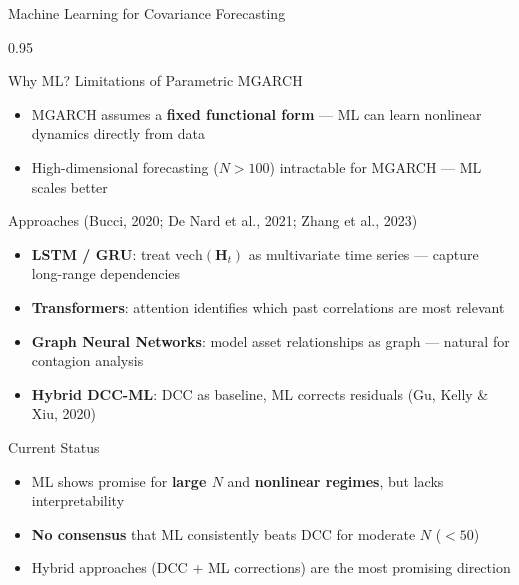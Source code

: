\documentclass[9pt, aspectratio=169, t]{beamer}
\begin{document}
\begin{frame}{Machine Learning for Covariance Forecasting}
    \begin{cminipage}{0.95\textwidth}
    \vspace{-3mm}
    {\scriptsize
    \begin{block}{Why ML? Limitations of Parametric MGARCH}
        \begin{itemize}\setlength{\itemsep}{0pt}
            \item MGARCH assumes a \textbf{fixed functional form} --- ML can learn nonlinear dynamics directly from data
            \item High-dimensional forecasting ($N > 100$) intractable for MGARCH --- ML scales better
        \end{itemize}
    \end{block}
    \vspace{-2mm}
    \begin{block}{Approaches (Bucci, 2020; De Nard et al., 2021; Zhang et al., 2023)}
        \begin{itemize}\setlength{\itemsep}{0pt}
            \item \textbf{LSTM / GRU}: treat $\text{vech}(\mathbf{H}_t)$ as multivariate time series --- capture long-range dependencies
            \item \textbf{Transformers}: attention identifies which past correlations are most relevant
            \item \textbf{Graph Neural Networks}: model asset relationships as graph --- natural for contagion analysis
            \item \textbf{Hybrid DCC-ML}: DCC as baseline, ML corrects residuals (Gu, Kelly \& Xiu, 2020)
        \end{itemize}
    \end{block}
    \vspace{-2mm}
    \begin{alertblock}{Current Status}
        \begin{itemize}\setlength{\itemsep}{0pt}
            \item ML shows promise for \textbf{large $N$} and \textbf{nonlinear regimes}, but lacks interpretability
            \item \textbf{No consensus} that ML consistently beats DCC for moderate $N$ ($< 50$)
            \item Hybrid approaches (DCC + ML corrections) are the most promising direction
        \end{itemize}
    \end{alertblock}
    }
    \end{cminipage}
\end{frame}
\end{document}
